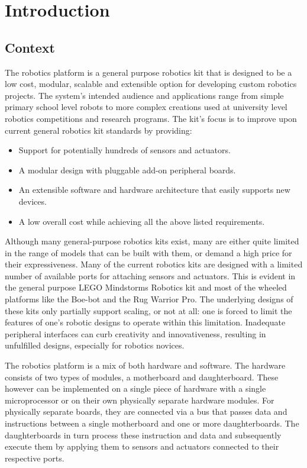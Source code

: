 \chapter{Introduction} 

\section{Context}
The \xten robotics platform is a general purpose robotics kit that is designed to be a low cost, modular, scalable and extensible option for developing custom robotics projects. The system's intended audience and applications range from simple primary school level robots to more complex creations used at university level robotics competitions and research programs. The \xten kit's focus is to improve upon current general robotics kit standards by providing:
\begin{itemize}
\item Support for potentially hundreds of sensors and actuators.
\item A modular design with pluggable add-on peripheral boards.
\item An extensible software and hardware architecture that easily supports new devices.
\item A low overall cost while achieving all the above listed requirements.
\end{itemize}

Although many general-purpose robotics kits exist, many are either quite limited in the range of models that can be built with them, or demand a high price for their expressiveness. Many of the current robotics kits are designed with a limited number of available ports for attaching sensors and actuators. This is evident in the general purpose LEGO Mindstorms Robotics kit and most of the wheeled platforms like the Boe-bot and the Rug Warrior Pro. %
The underlying designs of these kits only partially support scaling, or not at all: one is forced to limit the features of one's robotic designs to operate within this limitation. Inadequate peripheral interfaces can curb creativity and innovativeness, resulting in unfulfilled designs, especially for robotics novices.

The \xten robotics platform is a mix of both hardware and software. The hardware consists of two types of modules, a motherboard and daughterboard. These however can be implemented on a single piece of hardware with a single microprocessor or on their own physically separate hardware modules. For physically separate boards, they are connected via a bus that passes data and instructions between a single motherboard and one or more daughterboards. The daughterboards in turn process these instruction and data and subsequently execute them by applying them to sensors and actuators connected to their respective ports.

